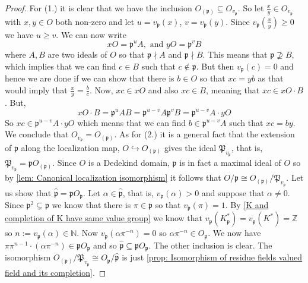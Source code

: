 \documentclass{article}
\newcommand{\mfrak}[1]{\mathfrak{#1}}
\newcommand{\mbb}[1]{\mathbb{#1}}
\newcommand{\vp}{{v_{\mfrak p}}}
\numberwithin{equation}{section}
\begin{document}
\begin{proof}
    For (1.) it is clear that we have the inclusion $O_{(\mfrak p)} \subseteq O_\vp$. So let $\frac{x}{y} \in O_\vp$ with $x,y \in O$ both non-zero and let $u = \vp(x)$, $v = \vp(y)$. Since $\vp(\frac{x}{y})  \geq 0$ we have $u \geq v$. We can now write
    $$x O = \mfrak p^u A, \text{ and } y O = \mfrak p^v B$$
    where $A,B$ are two ideals of $O$ so that $\mfrak p \nmid A$ and $\mfrak p \nmid B$. This means that $\mfrak p \nsupseteq B$, which implies that we can find $c \in B$ such that $c \notin \mfrak p$. But then $\vp(c) = 0$ and hence we are done if we can show that there is $b \in O$ so that $xc = yb$ as that would imply that $\frac{x}{y} = \frac{b}{c}$. Now, $xc \in x O$ and also $xc \in B$, meaning that $xc \in x O \cdot B$. But,
    $$x O \cdot B = \mfrak p^u A B = \mfrak p^{u-v} A \mfrak p^v B = \mfrak p^{u-v} A \cdot y O$$
    So $xc \in \mfrak p^{u-v} A \cdot y O$ which means that we can find $b \in \mfrak p^{u-v} A$ such that $xc = by$. We conclude that $O_\vp = O_{(\mfrak p)}$.
    As for (2.) it is a general fact that the extension of $\mfrak p$ along the localization map,
    $O \hookrightarrow O_{(\mfrak p)}$
    gives the ideal $\mfrak P_{\vp}$, that is, $\mfrak P_{\vp} = \mfrak p O_{(\mfrak p)}$. Since $O$ is a Dedekind domain, $\mfrak p$ is in fact a maximal ideal of $O$ so by \cref{lem: Canonical localization isomorphism} it follows that $O / \mfrak p \cong O_{(\mfrak p)} / \mfrak P_\vp$. Let us show that $\hat {\mfrak p} = \mfrak p O_\mfrak p$. Let $\alpha \in \hat {\mfrak p}$, that is, $\vp(\alpha) > 0$ and suppose that $\alpha \neq 0$. Since $\mfrak p^2 \subsetneq \mfrak p$ we know that there is $\pi \in \mfrak p$ so that $\vp(\pi) = 1$. By \cref{K and completion of K have same value group} we know that $\vp(K_\mfrak p^*) = \vp(K^*) = \mbb Z$ so $n := \vp(\alpha) \in \mbb N$. Now $\vp(\alpha \pi^{-n}) = 0$ so $\alpha \pi^{-n} \in O_\mfrak p$. We now have $\pi \pi^{n-1} \cdot (\alpha \pi^{-n}) \in \mfrak p O_\mfrak p$ and so $\hat {\mfrak p} \subseteq \mfrak p O_\mfrak p$. The other inclusion is clear. The isomorphism $O_{(\mfrak{p})} / \mfrak{P}_{v_{\mfrak{p}}} \cong O_{\mfrak{p}} / \hat{\mfrak{p}}$ is just \cref{prop: Isomorphism of residue fields valued field and its completion}.
\end{proof}
\end{document}
